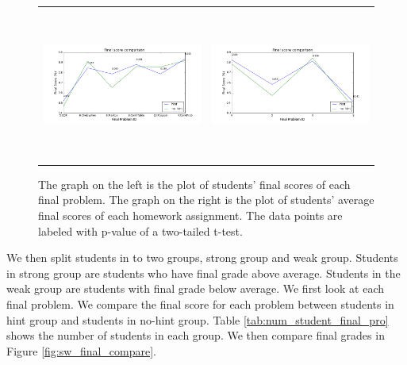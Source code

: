 \documentclass{article} %
\begin{document}
\begin{figure}[h]
\centering
	\begin{tabular}{c c}
		\includegraphics[width=0.5\linewidth, height=5cm]{image/final_compare} &
        \includegraphics[width=0.5\linewidth, height=5cm]{image/final_compare_assign}
    \end{tabular}
    \caption{The graph on the left is the plot of students' final scores of each final problem. The graph on the right is the plot of students' average final scores of each homework assignment. The data points are labeled with p-value of a two-tailed t-test.}
    \label{fig:final_compare_all}
\end{figure}

We then split students in to two groups, strong group and weak group. Students in strong group are students who have final grade above average. Students in the weak group are students with final grade below average. We first look at each final problem. We compare the final score for each problem between students in hint group and students in no-hint group. Table \ref{tab:num_student_final_pro} shows the number of students in each group. We then compare final grades in Figure \ref{fig:sw_final_compare}.
\end{document}
